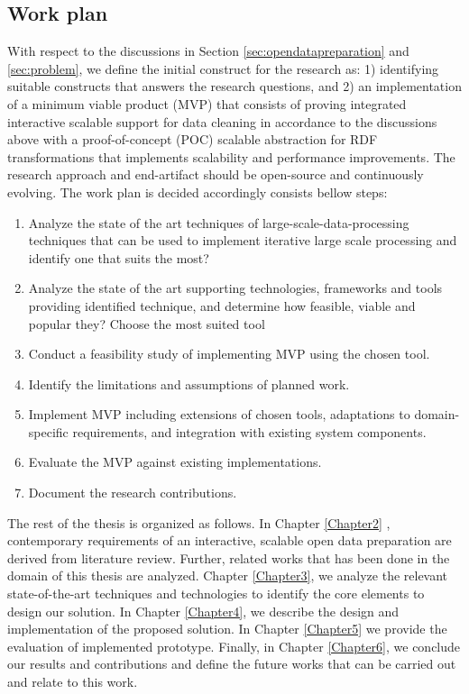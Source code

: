 \subsection{Work plan}
\noindent With respect to the discussions in Section \ref{sec:opendatapreparation}  and \ref{sec:problem}, we define the initial construct for the research as: 1) identifying suitable constructs that answers the research questions, and  2) an implementation of a minimum viable product (MVP) that consists of proving integrated interactive scalable support for data cleaning in accordance to the discussions above with a proof-of-concept (POC) scalable abstraction for RDF transformations that implements scalability and performance improvements. The research approach and end-artifact should be open-source and continuously evolving.  The work plan is decided accordingly consists bellow steps:
\begin{enumerate}
\item Analyze the state of the art techniques of large-scale-data-processing techniques that can be used to implement iterative large scale processing and identify one that suits the most?
\item Analyze the state of the art supporting technologies, frameworks and tools providing identified technique, and determine how feasible, viable and popular they? Choose the most suited tool
\item Conduct a feasibility study of implementing MVP using the chosen tool.
\item Identify the limitations and assumptions of planned work. 
\item Implement MVP including extensions of chosen tools, adaptations to domain-specific requirements, and integration with existing system components.
\item Evaluate the MVP against existing implementations.
\item Document the research contributions. 
\end{enumerate}

The rest of the thesis is organized as follows. In Chapter \ref{Chapter2} , contemporary requirements of an interactive, scalable open data preparation are derived from literature review. Further, related works that has been done in the domain of this thesis are analyzed. Chapter \ref{Chapter3}, we analyze the relevant state-of-the-art techniques and technologies to identify the core elements to design our solution. In Chapter \ref{Chapter4}, we describe the design and implementation of the proposed solution. In Chapter \ref{Chapter5}  we provide the evaluation of implemented prototype. Finally, in Chapter \ref{Chapter6}, we conclude our results and contributions and define the future works that can be carried out and relate to this work. 

